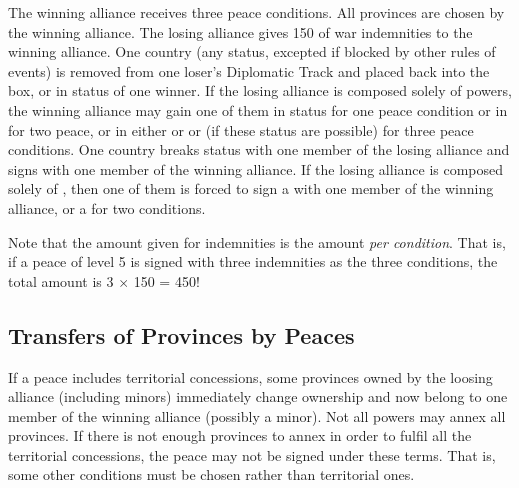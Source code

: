  The winning alliance receives
three peace conditions.
 All provinces are chosen by the winning
alliance.
\bparag[Indemnities] The losing alliance gives 150 \ducats of war indemnities
to the winning alliance.
 One country (any status, excepted if
blocked by other rules of events) is removed from one loser's Diplomatic Track
and placed back into the \Neutral box, or in \MR status of one winner. If the
losing alliance is composed solely of \MIN powers, the winning alliance may
gain one of them in \MR status for one peace condition or in \AM for two
peace, or in either \EG or \VASSAL or \ANNEXION (if these status are possible)
for three peace conditions.
 One \ROTW country breaks status with one
member of the losing alliance and signs \dipFR with one member of the winning
alliance. If the losing alliance is composed solely of \MIN, then one of them
is forced to sign a \dipFR with one member of the winning alliance, or a
\dipAT for two conditions.

\aparag[Indemnities] Note that the amount given for indemnities is the amount
\emph{per condition}. That is, if a peace of level 5 is signed with three
indemnities as the three conditions, the total amount is 3 $\times$ 150 =
450\ducats !

\subsection{Transfers of Provinces by Peaces}\label{chPeace:Transfer
  Provinces Peace}
\aparag If a peace includes territorial concessions, some provinces owned by
the loosing alliance (including minors) immediately change ownership and now
belong to one member of the winning alliance (possibly a minor).
\bparag Not all powers may annex all provinces. If there is not enough
provinces to annex in order to fulfil all the territorial concessions, the
peace may not be signed under these terms. That is, some other conditions must
be chosen rather than territorial ones.

